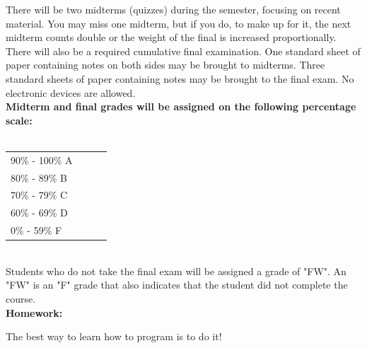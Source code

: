 \documentclass[11pt]{article}
\begin{document}
There will be two midterms (quizzes) during the semester, focusing on recent
material. You may miss one midterm, but if you do, to make up for it, the next
midterm counts double or the weight of the final is increased proportionally.
There will also be a required cumulative final examination. One standard sheet
of paper containing notes on both sides may be brought to midterms. Three
standard sheets of paper containing notes may be brought to the final exam. No
electronic devices are allowed.\\

\textbf {\large Midterm and final grades will be assigned on the following percentage scale:} \\\\
\hspace*{40mm}
\begin{tabular}{ l l | l l }
90\% - 100\% A \\
80\% - 89\% B \\
70\% - 79\% C \\
60\% - 69\% D \\
0\% - 59\% F \\
\end{tabular} \\

Students who do not take the final exam will be assigned a grade of "FW". An "FW" is an "F" grade that also indicates that the student did not complete the course.\\


\textbf {\large Homework:}

The best way to learn how to program is to do it!
\end{document}
